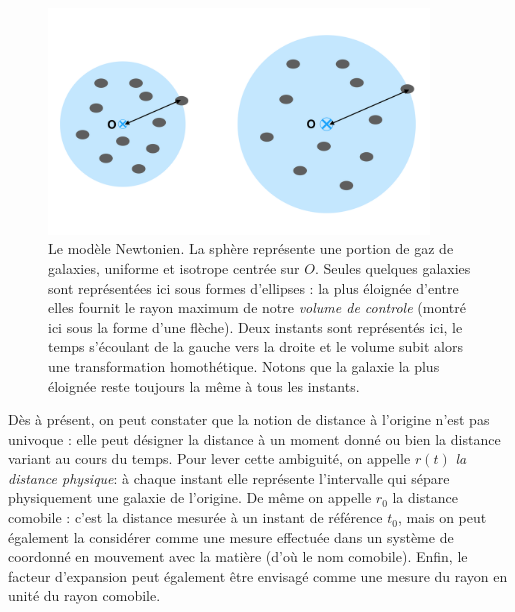 \begin{figure}[htbp]
	\centering
		\includegraphics[height=6cm]{figs/newton.png}
	\caption[le modèle cosmologique Newtonien]{Le modèle Newtonien. La sphère représente une portion de gaz de galaxies, uniforme et isotrope centrée sur $O$. Seules quelques galaxies sont représentées ici sous formes d'ellipses : la plus éloignée d'entre elles fournit le rayon maximum de notre \textit{volume de controle} (montré ici sous la forme d'une flèche). Deux instants sont représentés ici, le temps s'écoulant de la gauche vers la droite et le volume subit alors une transformation homothétique. Notons que la galaxie la plus éloignée reste toujours la même à tous les instants.}
	\label{f:newton}
\end{figure}

Dès à présent, on peut constater que la notion de distance à l'origine n'est pas univoque : elle peut désigner la distance à un moment donné ou bien la distance variant au cours du temps. Pour lever cette ambiguité, on appelle $r(t)$ \textit{la distance physique}: à chaque instant elle représente l'intervalle qui sépare physiquement une galaxie de l'origine. De même on appelle $r_0$ la distance  comobile : c'est la distance mesurée à un instant de référence $t_0$, mais on peut également la considérer comme une mesure effectuée dans un système de coordonné en mouvement avec la matière (d'où le nom comobile). Enfin, le facteur d'expansion peut également être envisagé comme une mesure du rayon en unité du rayon comobile.

